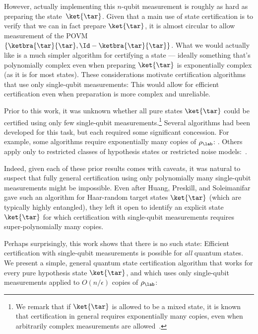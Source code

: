 However, actually implementing this $n$-qubit measurement is roughly as hard as preparing the state~$\ket{\tar}$. Given that a main use of state certification is to verify that we can in fact prepare $\ket{\tar}$, it is almost circular to allow measurement of the POVM $\{\ketbra{\tar}{\tar}, \Id - \ketbra{\tar}{\tar}\}$. What we would  actually like is a much simpler algorithm for certifying a state --- ideally something that's polynomially complex even when preparing $\ket{\tar}$ is exponentially complex (as it is for most states). These considerations motivate certification algorithms that use only single-qubit measurements: This would allow for efficient certification even when preparation is more complex and unreliable.

Prior to this work, it was unknown whether all pure states $\ket{\tar}$ could be certified using only few single-qubit measurements.\footnote{We remark that if $\ket{\tar}$ is allowed to be a mixed state, it is known that certification in general requires exponentially many copies, even when arbitrarily complex measurements are allowed~\cite{CHW07,swan1swan2_21}.} Several algorithms had been developed for this task, but each required some significant concession. For example, some algorithms require exponentially many copies of $\rho_{\lab}$: \cite{flammia2011direct,da2011practical, aolita2015reliable}. Others apply only to restricted classes of hypothesis states or restricted noise models:~\cite{hayashi2006study,flammia2011direct,aolita2015reliable,hayashi2015verifiable,morimae2016quantum,morimae2017verification,takeuchi2018verification,gluza2018fidelity,hayashi2019verifying,li2019efficient,liu2019efficient,yu2019optimal,zhu2019efficient,li2021verification,huang2024certifying}. 

Indeed, given each of these prior results comes with caveats, it was natural to suspect that fully general certification using only polynomially many single-qubit measurements might be impossible. Even after Huang, Preskill, and Soleimanifar~\cite{huang2024certifying} gave such an algorithm for Haar-random target states $\ket{\tar}$ (which are typically highly entangled), they left it open to identify an explicit state $\ket{\tar}$ for which certification with single-qubit measurements requires super-polynomially many copies.

Perhaps surprisingly, this work shows that there is no such state: Efficient certification with single-qubit measurements is possible for \emph{all} quantum states. We present a simple, general quantum state certification algorithm that works for every pure hypothesis state $\ket{\tar}$, and which uses only single-qubit measurements applied to $O(n/\epsilon)$ copies of $\rho_{\lab}$:

